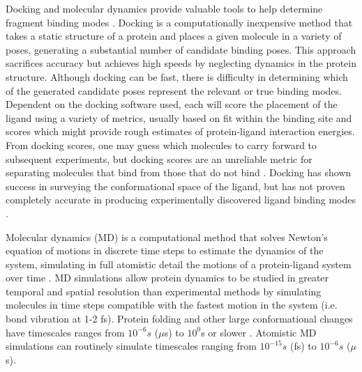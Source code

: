 Docking and molecular dynamics provide valuable tools to help determine fragment binding modes \cite{Rocklin2013BlindSite, durrant_computer-aided_2010, sliwoski_computational_2014}. 
Docking is a computationally inexpensive method that takes a static structure of a protein and places a given molecule in a variety of poses, generating a substantial number of candidate binding poses. 
This approach sacrifices accuracy but achieves high speeds by neglecting dynamics in the protein structure.
Although docking can be fast, there is difficulty in determining which of the generated candidate poses represent the relevant or true binding modes.
Dependent on the docking software used, each will score the placement of the ligand using a variety of metrics, usually based on fit within the binding site and scores which might provide rough estimates of protein-ligand interaction energies.
From docking scores, one may guess which molecules to carry forward to subsequent experiments, but docking scores are an unreliable metric for separating molecules that bind from those that do not bind \cite{lape_comparison_2010, plewczynski_can_2011, ramirez_is_2018, gohlke_knowledge-based_2000, warren_critical_2006}.
Docking has shown success in surveying the conformational space of the ligand, but has not proven completely accurate in producing experimentally discovered ligand binding modes \cite{guedes_receptorligand_2013, warren_critical_2006}.

Molecular dynamics (MD) is a computational method that solves Newton's equation of motions in discrete time steps to estimate the dynamics of the system, simulating in full atomistic detail the motions of a protein-ligand system over time \cite{hospital_molecular_2015, hollingsworth_molecular_2018}.
MD simulations allow protein dynamics to be studied in greater temporal and spatial resolution than experimental methods by simulating molecules in time steps compatible with the fastest motion in the system (i.e. bond vibration at 1-2 fs). 
Protein folding and other large conformational changes have timescales ranges from \(10^{-6}s\) (\(\mu\)s) to \(10^{0}\)s or slower \cite{han_protein_2014}. 
Atomistic MD simulations can routinely simulate timescales ranging from \(10^{-15}s\) (fs) to \(10^{-6}s\) (\(\mu\)s). 

